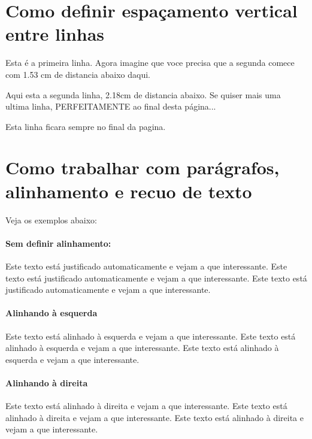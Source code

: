 \documentclass[12pt, a4paper]{article}
\begin{document}
\newpage
\section{Como definir espaçamento vertical entre linhas}

Esta é a primeira linha. Agora imagine que voce precisa que a segunda comece com 1.53 cm de distancia abaixo daqui.
\vspace{1.53cm}

Aqui esta a segunda linha, 2.18cm de distancia abaixo. Se quiser mais uma ultima linha, PERFEITAMENTE ao final desta página...
\vspace{\fill} %

Esta linha ficara sempre no final da pagina.

\newpage
\section{Como trabalhar com parágrafos, alinhamento e recuo de texto}

Veja os exemplos abaixo:

\paragraph{Sem definir alinhamento:}
Este texto está justificado automaticamente e vejam a que interessante. Este texto está justificado automaticamente e vejam a que interessante. Este texto está justificado automaticamente e vejam a que interessante. 

\paragraph{Alinhando à esquerda}
\begin{flushleft}
Este texto está alinhado à esquerda e vejam a que interessante. Este texto está alinhado à esquerda e vejam a que interessante. Este texto está alinhado à esquerda e vejam a que interessante. 
\end{flushleft}

\paragraph{Alinhando à direita}
\begin{flushright}
Este texto está alinhado à direita e vejam a que interessante. Este texto está alinhado à direita e vejam a que interessante. Este texto está alinhado à direita e vejam a que interessante. 
\end{flushright}
\end{document}
